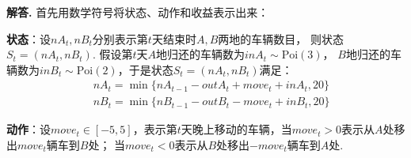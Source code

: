 \documentclass[12pt, a4paper, oneside]{ctexart}
\newenvironment{solution}[1][]{\par\noindent\textbf{#1解答. }}{\smallskip\par}  %
\begin{document}
\begin{solution}首先用数学符号将状态、动作和收益表示出来：

    \textbf{状态}：设$nA_t, nB_t$分别表示第$t$天结束时$A,B$两地的车辆数目，
    则状态$S_t = (nA_t, nB_t)$. 假设第$t$天$A$地归还的车辆数为$inA_t\sim \text{Poi}(3)$，
    $B$地归还的车辆数为$inB_t\sim \text{Poi}(2)$，于是状态$S_t= (nA_t,nB_t)$满足：
    \begin{align*}
        &\ nA_t = \min\{nA_{t-1}-outA_t+move_t+inA_t, 20\}\\
        &\ nB_t = \min\{nB_{t-1} - outB_t - move_t + inB_t, 20\}
    \end{align*}

    \textbf{动作}：设$move_t\in [-5, 5]$，表示第$t$天晚上移动的车辆，当$move_t > 0$表示从$A$处移出$move_t$辆车到$B$处；
    当$move_t < 0$表示从$B$处移出$-move_t$辆车到$A$处.


\end{solution}
\end{document}
